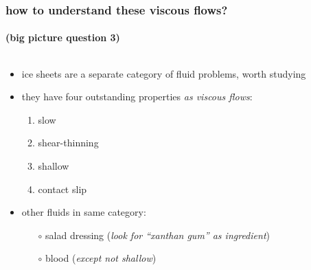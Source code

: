 \documentclass[hide notes,intlimits]{beamer}
\begin{document}
\begin{frame}
  \frametitle{how to understand these viscous flows?}
  \framesubtitle{(big picture question 3)}

\begin{columns}
\begin{column}{0.6\textwidth}
\begin{itemize}
\item ice sheets are a separate category of fluid problems, worth studying
\item they have four outstanding properties \emph{as viscous flows}:
  \begin{enumerate}
  \item \alert{slow}
  \item \alert{shear-thinning}
  \item \alert{shallow}
  \item \alert{contact slip}
  \end{enumerate}
\item other fluids in same category:
  \begin{itemize}
  \item[$\circ$] salad dressing (\emph{look for ``xanthan gum'' as ingredient})
  \item[$\circ$] blood (\emph{except not shallow})
  \end{itemize}
\end{itemize}
\end{column}
\begin{column}{0.4\textwidth}


\end{column}
\end{columns}
\end{frame}
\end{document}
